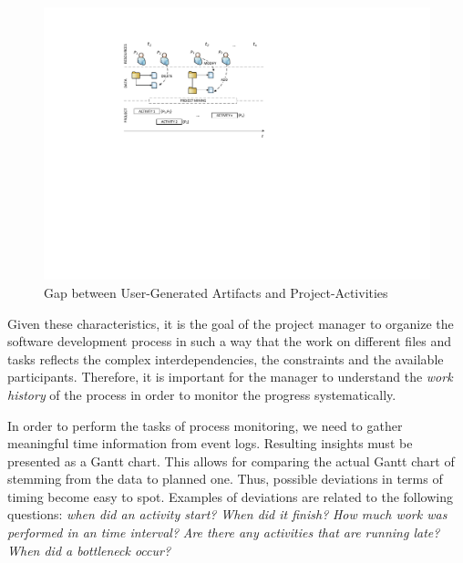 \begin{figure}[htbp!]
	\centering
	\includegraphics[width=.8\textwidth]{bpm2015/imgs/ProjectMining.pdf}
	\caption{Gap between User-Generated Artifacts and Project-Activities}
	\label{fig:bpm2015problem}
\end{figure}


Given these characteristics, it is the goal of the project manager to organize the software development process in such a way that the work on different files and tasks reflects the complex interdependencies, the constraints and the available participants. Therefore, it is important for the manager to understand the \emph{work history} of the process in order to monitor the progress systematically.
 


In order to perform the tasks of process monitoring, we need to gather meaningful time information from event logs. Resulting insights must be presented as a Gantt chart. This allows for comparing the actual Gantt chart of stemming from the data to planned one. Thus, possible deviations in terms of timing become easy to spot. Examples of deviations are related to the following questions: \emph{when did an activity start?} \emph{When did it finish?} \emph{How much work was performed in an time interval?} \emph{Are there any activities that are running late?} \emph{When did a bottleneck occur?} 


